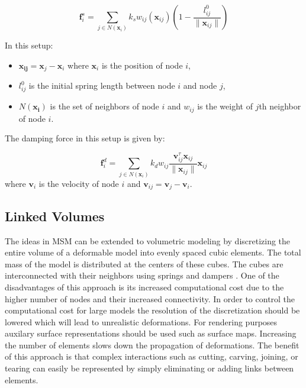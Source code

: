 \begin{equation}
 \boldsymbol{f}^s_i = \sum_{j \in N(\boldsymbol{x}_i)} k_s w_{ij}(\boldsymbol{x}_{ij})(1-\frac{l^0_{ij}}{\| \boldsymbol{x}_{ij} \|})
\end{equation}

In this setup:

\begin{itemize}
 \item $\boldsymbol{x_{ij}} = \boldsymbol{x}_j - \boldsymbol{x}_i$ where $\boldsymbol{x}_i$ is the position of node $i$, 
 \item $l^0_{ij}$ is the initial spring length between node $i$ and node $j$,
 \item $N(\boldsymbol{x_i})$ is the set of neighbors of node $i$ and $w_{ij}$ is the weight of $j$th neighbor of node $i$.
\end{itemize}

The damping force in this setup is given by:

\begin{equation}
 \boldsymbol{f}^d_i = \sum_{j \in N(\boldsymbol{x}_i)} k_d w_{ij} \frac{\boldsymbol{v}^\tau_{ij} \boldsymbol{x}_{ij} }{\|\boldsymbol{x}_{ij} \|} \boldsymbol{x}_{ij}
\end{equation}
where $\boldsymbol{v}_i$ is the velocity of node $i$ and $\boldsymbol{v}_{ij} = \boldsymbol{v}_j - \boldsymbol{v}_i$.

\subsection{Linked Volumes}
\label{sec:linkedvolumes}
The ideas in MSM can be extended to volumetric modeling by discretizing the entire volume of a deformable model into evenly spaced cubic elements.
The total mass of the model is distributed at the centers of these cubes. The cubes are interconnected with their neighbors using springs and dampers
\cite{gibson1997simulating}. One of the disadvantages of this approach is its increased computational cost due to the higher number of nodes and
their increased connectivity. In order to control the computational cost for large models the resolution of the discretization should be lowered 
which will lead to unrealistic deformations. For rendering purposes auxilary surface representations should be used such as surface maps. 
Increasing the number of elements slows down the propagation of deformations. The benefit of this approach is that complex interactions such as
cutting, carving, joining, or tearing can easily be represented by simply eliminating or adding links between elements.


